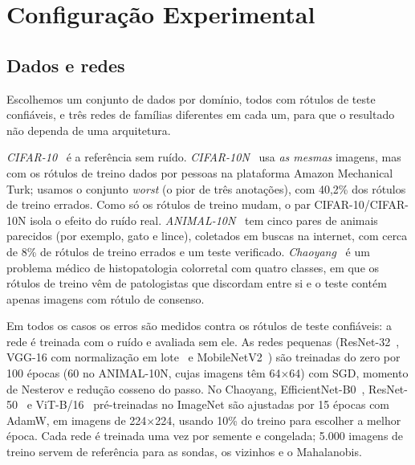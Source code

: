 \documentclass[conference,a4paper]{IEEEtran}
\begin{document}
\section{Configuração Experimental}

\subsection{Dados e redes}
Escolhemos um conjunto de dados por domínio, todos com rótulos de teste confiáveis, e três redes de famílias diferentes em cada um,
para que o resultado não dependa de uma arquitetura.

\emph{CIFAR-10}~\cite{krizhevsky2009} é a referência sem ruído. \emph{CIFAR-10N}~\cite{wei2022} usa \emph{as mesmas} imagens, mas com os
rótulos de treino dados por pessoas na plataforma Amazon Mechanical Turk; usamos o conjunto \textit{worst} (o pior de três anotações),
com 40,2\% dos rótulos de treino errados. Como só os rótulos de treino mudam, o par CIFAR-10/CIFAR-10N isola o efeito do ruído real.
\emph{ANIMAL-10N}~\cite{song2019} tem cinco pares de animais parecidos (por exemplo, gato e lince), coletados em buscas na internet, com
cerca de 8\% de rótulos de treino errados e um teste verificado. \emph{Chaoyang}~\cite{zhu2022} é um problema médico de histopatologia
colorretal com quatro classes, em que os rótulos de treino vêm de patologistas que discordam entre si e o teste contém apenas imagens com
rótulo de consenso. %

Em todos os casos os erros são medidos contra os rótulos de teste confiáveis: a rede é treinada com o ruído e avaliada sem ele. As redes
pequenas (ResNet-32~\cite{he2016}, VGG-16 com normalização em lote~\cite{simonyan2015} e MobileNetV2~\cite{sandler2018}) são treinadas do
zero por 100 épocas (60 no ANIMAL-10N, cujas imagens têm 64$\times$64) com SGD, momento de Nesterov e redução cosseno do passo. No
Chaoyang, EfficientNet-B0~\cite{tan2019}, ResNet-50~\cite{he2016} e ViT-B/16~\cite{dosovitskiy2021} pré-treinadas no ImageNet são
ajustadas por 15 épocas com AdamW, em imagens de 224$\times$224, usando 10\% do treino para escolher a melhor época. Cada rede é treinada
uma vez por semente e congelada; 5.000 imagens de treino servem de referência para as sondas, os vizinhos e o Mahalanobis.
\end{document}
